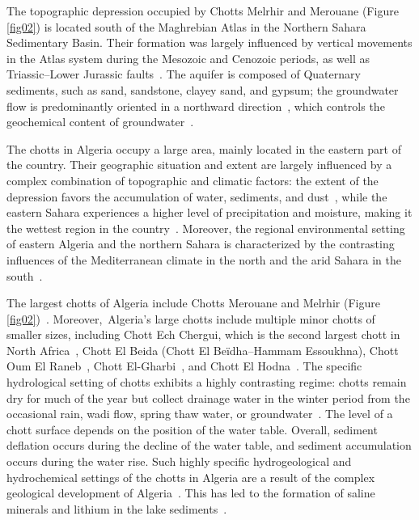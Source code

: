 \documentclass[asi,article,accept,pdftex,moreauthors]{Definitions/mdpi}
\begin{document}
The topographic depression occupied by Chotts Melrhir and Merouane (Figure \ref{fig02}) is located south of the Maghrebian Atlas in the Northern Sahara Sedimentary Basin. Their formation was largely influenced by vertical movements in the Atlas system during the Mesozoic and Cenozoic periods, as well as  Triassic--Lower Jurassic faults~\cite{DELAMOTTE20099}. The aquifer is composed of Quaternary sediments, such as sand, sandstone, clayey sand, and gypsum; the groundwater flow is predominantly oriented in a northward direction~\cite{BOUSELSAL2022100747,BALLAIS1991209}, which controls the geochemical content of groundwater~\cite{daoud1995caracterisation}.

The chotts in Algeria occupy a large area, mainly located in the eastern part of the country. Their geographic situation and extent are largely influenced by a complex combination of topographic and climatic factors: the extent of the depression favors the accumulation of water, sediments, and dust~\cite{Klose,Goudie2022}, {while} the eastern Sahara experiences a higher level of precipitation and moisture, making it the wettest region in the country~\cite{Nedjraoui,Benkhaled}. {Moreover}, the regional environmental setting of eastern Algeria and the northern Sahara is characterized by the contrasting influences of the Mediterranean climate in the north and the arid Sahara in the south~\cite{Ficheur,Mebarki}. 

The largest chotts of Algeria include Chotts Merouane and Melrhir (Figure \ref{fig02})~\cite{HACINI2006284}. {Moreover,~}{Algeria's large chotts include multiple minor chotts of smaller sizes,} including Chott Ech Chergui, which is the second largest chott in North Africa~\cite{Maizi,habibi2013analyse,Demnati,Larnaude}, Chott El Beida (Chott El Beïdha--Hammam Essoukhna), Chott Oum El Raneb~\cite{KHAZNADAR2009369}, Chott El-Gharbi~\cite{CHERCHALI2023105537}, and Chott El Hodna~\cite{AISSAOUI1989413}. The specific hydrological setting of chotts exhibits {a highly} contrasting regime: chotts remain dry for much of the year but collect drainage water in the winter period from the occasional rain, {wadi} flow, spring thaw water, or groundwater~\cite{Larfa,achour2014vulnerabilite}. The level of a chott surface depends on the position of the water table. {Overall}, sediment deflation occurs during the decline of the water table, and sediment accumulation occurs during {the }water rise{. }Such highly specific hydrogeological and hydrochemical settings of the chotts in Algeria are a result of the complex geological  development of Algeria~\cite{CABY1987335,BOUBEKRI2015471,DARLING2018277,BENYOUCEF2023105547}{. This has led} to the formation of saline minerals and lithium in the lake sediments~\cite{HACINI20081583,MEFTAH20222105,DIAZCUEVAS2021101445}. 
\end{document}
